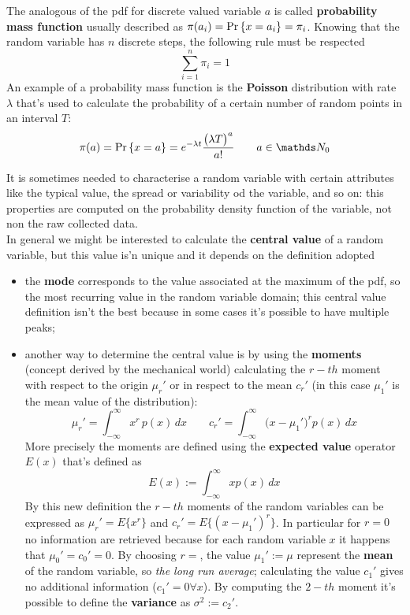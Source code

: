 	The analogous of the pdf for discrete valued variable $a$ is called \textbf{probability mass function} usually described as $\pi(a_i) = \textrm{Pr}\left\{ x=a_i \right\} = \pi_i$. Knowing that the random variable has $n$ discrete steps, the following rule must be respected
	\[\sum_{i=1}^n \pi_i = 1\]
	An example of a probability mass function is the \textbf{Poisson} distribution with rate $\lambda$ that's used to calculate the probability of a certain number of random points in an interval $T$:
	\[ \pi(a) = \prob{x=a} = e^{-\lambda t} \frac{\big(\lambda T\big)^a}{a!} \qquad a \in \mathds N_0 \]
	\vspace{3mm}
	
	It is sometimes needed to characterise a random variable with certain attributes like the typical value, the spread or variability od the variable, and so on: this properties are computed on the probability density function of the variable, not non the raw collected data.\\
	In general we might be interested to calculate the \textbf{central value} of a random variable, but this value is'n unique and it depends on the definition adopted
	\begin{itemize}
		\item the \textbf{mode} corresponds to the value associated at the maximum of the pdf, so the most recurring value in the random variable domain; this central value definition isn't the best because in some cases it's possible to have multiple peaks;
		
		\item another way to determine the central value is by using the \textbf{moments} (concept derived by the mechanical world) calculating the $r-th$ moment with respect to the origin $\mu_r'$ or in respect to the mean $c_r'$ (in this case $\mu_1'$ is the mean value of the distribution):
		\[ \mu_r' = \int_{-\infty}^\infty x^r\, p(x)\, dx \qquad c_r' = \int_{-\infty}^\infty \big(x-\mu_1'\big)^r p(x)\, dx \]
		More precisely the moments are defined using the \textbf{expected value} operator $E(x)$ that's defined as
		\[ E(x) := \int_{-\infty}^\infty x p(x)\, dx\]
		By this new definition the $r-th$ moments of the random variables can be expressed as $\mu_r' = E\{x^r\}$ and $c_r' = E \big\{ (x-\mu_1')^r \big\}$. In particular for $r = 0$ no information are retrieved because for each random variable $x$ it happens that $\mu_0' = c_0' = 0$. By choosing $r = $, the value $\mu_1' := \mu$ represent the \textbf{mean} of the random variable, so \textit{the long run average}; calculating the value $c_1'$ gives no additional information ($c_1' = 0 \forall x$). By computing the $2-th$ moment it's possible to define the \textbf{variance} as $\sigma^2 := c_2'$.
	\end{itemize}


